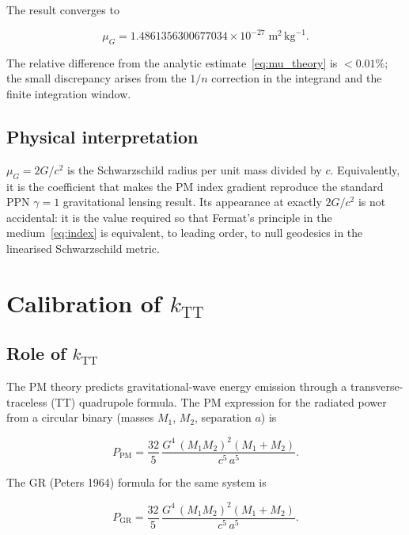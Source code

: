 \documentclass{article}
\begin{document}
The result converges to

\begin{equation}
  \mu_G = 1.4861356300677034 \times 10^{-27}\;\text{m}^2\,\text{kg}^{-1}.
  \label{eq:mu_result}
\end{equation}

The relative difference from the analytic estimate~\eqref{eq:mu_theory} is
$< 0.01\%$; the small discrepancy arises from the $1/n$ correction in the
integrand and the finite integration window.

\subsection{Physical interpretation}

$\mu_G = 2G/c^2$ is the Schwarzschild radius per unit mass divided by $c$.
Equivalently, it is the coefficient that makes the PM index gradient reproduce
the standard PPN $\gamma = 1$ gravitational lensing result.  Its appearance at
exactly $2G/c^2$ is not accidental: it is the value required so that
Fermat's principle in the medium~\eqref{eq:index} is equivalent, to leading
order, to null geodesics in the linearised Schwarzschild metric.

\section{Calibration of $k_{\mathrm{TT}}$}
\label{sec:kTT}

\subsection{Role of $k_{\mathrm{TT}}$}

The PM theory predicts gravitational-wave energy emission through a
transverse-traceless (TT) quadrupole formula.  The PM expression for the
radiated power from a circular binary (masses $M_1$, $M_2$, separation $a$) is

\begin{equation}
  P_{\mathrm{PM}} = \frac{32}{5}\,\frac{G^4\,(M_1 M_2)^2(M_1+M_2)}{c^5\,a^5}.
  \label{eq:pm_power}
\end{equation}

The GR (Peters 1964) formula for the same system is

\begin{equation}
  P_{\mathrm{GR}} = \frac{32}{5}\,\frac{G^4\,(M_1 M_2)^2(M_1+M_2)}{c^5\,a^5}.
  \label{eq:gr_power}
\end{equation}
\end{document}

